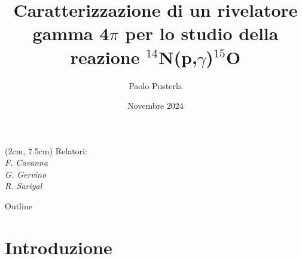 \documentclass [xcolor=svgnames, 9pt] {beamer}
\title[P. Pusterla]{Caratterizzazione di un rivelatore gamma 4$\pi$ per lo studio della reazione $^{14}$N(p,$\gamma$)$^{15}$O}
\author[Fisica]{Paolo Pusterla}
\institute[UniTo]{Università degli Studi di Torino}
\date{Novembre 2024}
\begin{document}
	\begin{frame}
		\titlepage
		\begin{textblock*}{6cm}(2cm, 7.5cm) %
			\large 
			Relatori:\\
			\textit{F. Cavanna}\\
			\textit{G. Gervino}\\
			\textit{R. Sariyal}
		\end{textblock*}
	\end{frame}
	
	\begin{frame}{Outline}
		\tableofcontents
	\end{frame}
	
\section{Introduzione}
\end{document}
